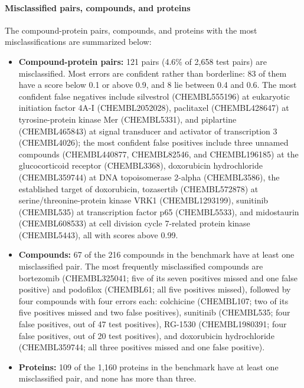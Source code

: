 \documentclass[11pt,letterpaper]{article}
\begin{document}
\paragraph{Misclassified pairs, compounds, and proteins}
The compound-protein pairs, compounds, and proteins with the most misclassifications are summarized below:
\begin{itemize}
    \item \textbf{Compound-protein pairs:} 121 pairs (4.6\% of 2,658 test pairs) are misclassified. Most errors are confident rather than borderline: 83 of them have a score below 0.1 or above 0.9, and 8 lie between 0.4 and 0.6. The most confident false negatives include silvestrol (CHEMBL555196) at eukaryotic initiation factor 4A-I (CHEMBL2052028), paclitaxel (CHEMBL428647) at tyrosine-protein kinase Mer (CHEMBL5331), and piplartine (CHEMBL465843) at signal transducer and activator of transcription 3 (CHEMBL4026); the most confident false positives include three unnamed compounds (CHEMBL440877, CHEMBL82546, and CHEMBL196185) at the glucocorticoid receptor (CHEMBL3368), doxorubicin hydrochloride (CHEMBL359744) at DNA topoisomerase 2-alpha (CHEMBL3586), the established target of doxorubicin, tozasertib (CHEMBL572878) at serine/threonine-protein kinase VRK1 (CHEMBL1293199), sunitinib (CHEMBL535) at transcription factor p65 (CHEMBL5533), and midostaurin (CHEMBL608533) at cell division cycle 7-related protein kinase (CHEMBL5443), all with scores above 0.99.

    \item \textbf{Compounds:} 67 of the 216 compounds in the benchmark have at least one misclassified pair. The most frequently misclassified compounds are bortezomib (CHEMBL325041; five of its seven positives missed and one false positive) and podofilox (CHEMBL61; all five positives missed), followed by four compounds with four errors each: colchicine (CHEMBL107; two of its five positives missed and two false positives), sunitinib (CHEMBL535; four false positives, out of 47 test positives), RG-1530 (CHEMBL1980391; four false positives, out of 20 test positives), and doxorubicin hydrochloride (CHEMBL359744; all three positives missed and one false positive).

    \item \textbf{Proteins:} 109 of the 1,160 proteins in the benchmark have at least one misclassified pair, and none has more than three.
\end{itemize}
\end{document}
